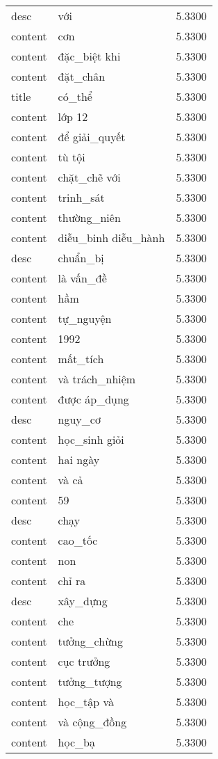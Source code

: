 \documentclass{article}
\begin{document}
\begin{tabular}{lll}
desc & với & 5.3300\\
content & cơn & 5.3300\\
content & đặc\_biệt khi & 5.3300\\
content & đặt\_chân & 5.3300\\
title & có\_thể & 5.3300\\
content & lớp 12 & 5.3300\\
content & để giải\_quyết & 5.3300\\
content & tù tội & 5.3300\\
content & chặt\_chẽ với & 5.3300\\
content & trinh\_sát & 5.3300\\
content & thường\_niên & 5.3300\\
content & diễu\_binh diễu\_hành & 5.3300\\
desc & chuẩn\_bị & 5.3300\\
content & là vấn\_đề & 5.3300\\
content & hầm & 5.3300\\
content & tự\_nguyện & 5.3300\\
content & 1992 & 5.3300\\
content & mất\_tích & 5.3300\\
content & và trách\_nhiệm & 5.3300\\
content & được áp\_dụng & 5.3300\\
desc & nguy\_cơ & 5.3300\\
content & học\_sinh giỏi & 5.3300\\
content & hai ngày & 5.3300\\
content & và cả & 5.3300\\
content & 59 & 5.3300\\
desc & chạy & 5.3300\\
content & cao\_tốc & 5.3300\\
content & non & 5.3300\\
content & chỉ ra & 5.3300\\
desc & xây\_dựng & 5.3300\\
content & che & 5.3300\\
content & tưởng\_chừng & 5.3300\\
content & cục trưởng & 5.3300\\
content & tưởng\_tượng & 5.3300\\
content & học\_tập và & 5.3300\\
content & và cộng\_đồng & 5.3300\\
content & học\_bạ & 5.3300\\

\end{tabular}
\end{document}
